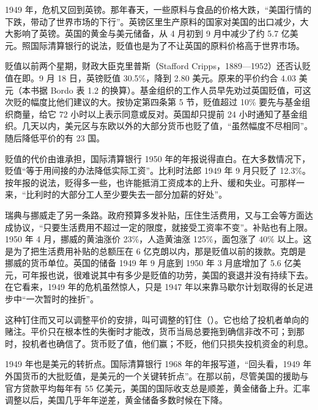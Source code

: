 1949 年，危机又回到英镑。那年春天，一些原料与食品的价格大跌，“美国行情的下跌，带动了世界市场的下行”\cite{bis36}。英镑区里生产原料的国家对美国的出口减少，大大影响了英镑\cite{bis36}。英国的黄金与美元储备，从 4 月初到 9 月中减少了约 5.7 亿美元\cite{bis36}。照国际清算银行的说法，贬值也是为了不让英国的原料价格高于世界市场\cite{bis36}。

贬值以前两个星期，财政大臣克里普斯（Stafford Cripps，1889—1952）还否认贬值在即\cite{bordo1993,loc36}。9 月 18 日，英镑贬值 30.5\%，降到 2.80 美元\cite{bordo1993}。原来的平价约合 4.03 美元（本书据 Bordo 表 1.2 的换算）\cite{bordo1993}。基金组织的工作人员早先劝过英国贬值，可这次贬的幅度比他们建议的大。按协定第四条第 5 节，贬值超过 10\% 要先与基金组织商量，给它 72 小时以上表示同意或反对。英国却只提前 24 小时通知了基金组织\cite{bordo1993}。几天以内，美元区与东欧以外的大部分货币也贬了值，“虽然幅度不尽相同”\cite{bis36}。随后降低平价的有 23 国\cite{bordo1993}。

贬值的代价由谁承担，国际清算银行 1950 年的年报说得直白。在大多数情况下，贬值“等于用间接的办法降低实际工资”\cite{bis36}。比利时法郎 1949 年 9 月只贬了 12.3\%。按年报的说法，贬得多一些，也许能抵消工资成本的上升、缓和失业。可那样一来，“比利时的大部分工人至少要失去一部分加薪的好处”\cite{bis36}。

瑞典与挪威走了另一条路。政府预算多发补贴，压住生活费用，又与工会等方面达成协议，“只要生活费用不超过一定的限度，就接受工资率不变”\cite{bis36}。补贴也有上限。1950 年 4 月，挪威的黄油涨价 23\%，人造黄油涨 125\%，面包涨了 40\% 以上\cite{bis36}。这是为了把生活费用补贴的总额压在 6 亿克朗以内，那是贬值以前的拨款\cite{bis36}。克朗是挪威的货币单位。英国的储备 1949 年 9 月底到 1950 年 3 月底增加了 5.6 亿美元，可年报也说，很难说其中有多少是贬值的功劳，美国的衰退并没有持续下去\cite{bis36}。在它看来，1949 年的危机虽然惊人，只是 1947 年以来靠马歇尔计划取得的长足进步中“一次暂时的挫折”\cite{bis36}。

这种钉住而又可以调整平价的安排，叫可调整的钉住（）。它也给了投机者单向的赌注。平价只在根本性的失衡时才能改，货币当局总要拖到确信非改不可；到那时，投机者也确信了\cite{bordo1993}。货币贬了值，他们赢；不贬，他们只损失投机资金的利息\cite{bordo1993}。

1949 年也是美元的转折点。国际清算银行 1968 年的年报写道，“回头看，1949 年外国货币的大批贬值，是美元的一个关键转折点”\cite{bis36}。在那以前，尽管美国的援助与官方贷款平均每年有 55 亿美元，美国的国际收支总是顺差，黄金储备上升\cite{bis36}。汇率调整以后，美国几乎年年逆差，黄金储备多数时候在下降\cite{bis36}。

